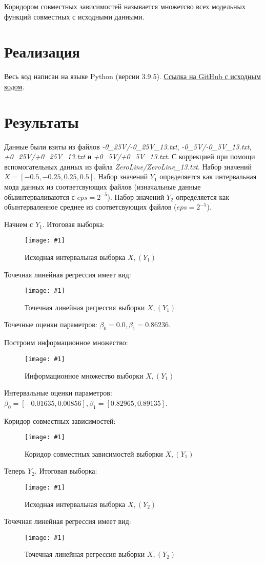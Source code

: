 \documentclass[a4paper,12pt]{article}
\newcommand{\plot}[3]{
    \begin{figure}[H]
        \begin{center}
            \texttt{[image: \#1]}
            \caption{#2}
            \label{#3}
        \end{center}
    \end{figure}
}
\begin{document}
    \quad Коридором совместных зависимостей называется множетсво всех модельных функций
    совместных с исходными данными.

    \section{Реализация}
    \quad Весь код написан на языке Python (версии 3.9.5).
    \href{https://github.com/BoIlAl/Intervals/tree/master/lab2}{Ссылка на GitHub с исходным кодом}.

    \section{Результаты}
    \quad Данные были взяты из файлов \textsl{-0\_25V/-0\_25V\_13.txt}, \textsl{-0\_5V/-0\_5V\_13.txt}, \textsl{+0\_25V/+0\_25V\_13.txt} и
    \textsl{+0\_5V/+0\_5V\_13.txt}. С коррекцией при помощи вспомогательных данных из 
    файла \textsl{ZeroLine/ZeroLine\_13.txt}. Набор значений
    $ X = [-0.5, -0.25, 0.25, 0.5] $. Набор значений $ Y_1 $ определяется как интервальная
    мода данных из соответсвующих файлов (изначальные данные обыинтерваливаются с 
    $eps = 2^{-5} $). Набор значений $ Y_2 $ определяется как обынтерваленное среднее 
    из соответсвующих файлов ($eps = 2^{-5} $). 
    
    Начнем с $ Y_1 $. Итоговая выборка:
    \plot{img/X, (Y1).png}{Исходная интервальная выборка $ X, (Y_1) $}{p:y1}
    
    Точечная линейная регрессия имеет вид: 
    \plot{img/Regression X, (Y1).png}{Точечная линейная регрессия выборки $ X, (Y_1) $}{p:regY1}

    Точечные оценки параметров: $ \beta_0 = 0.0, \beta_1 = 0.86236 $.

    Построим информационное множество:
    \plot{img/Inform X, (Y1).png}{Информационное множество выборки $ X, (Y_1) $}{p:infY1}

    Интервальные оценки параметров: $ \beta_0 = [-0.01635, 0.00856],
    \beta_1 = [0.82965, 0.89135] $.

    Коридор совместных зависимостей:
    \plot{img/Corridor X, (Y1).png}{Коридор совместных зависимостей выборки $ X, (Y_1) $}{p:corY1}

    Теперь $ Y_2 $. Итоговая выборка:
    \plot{img/X, (Y2).png}{Исходная интервальная выборка $ X, (Y_2) $}{p:y2}

    Точечная линейная регрессия имеет вид: 
    \plot{img/Regression X, (Y2).png}{Точечная линейная регрессия выборки $ X, (Y_2) $}{p:regY2}
    
\end{document}

